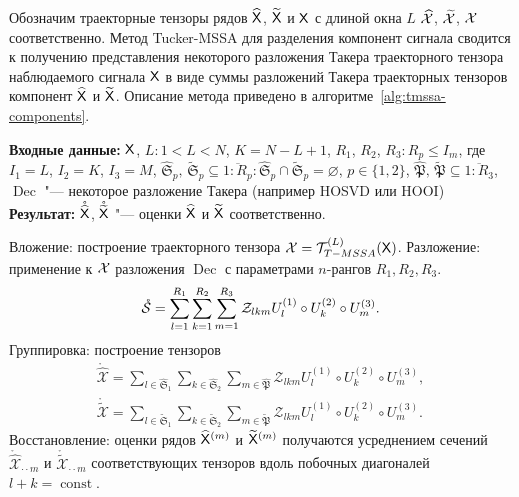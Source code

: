 \documentclass[specialist,
  substylefile = spbu.rtx,
subf,href,colorlinks=true, 12pt]{disser}
\theoremstyle{plain}
\theoremstyle{definition}
\theoremstyle{remark}
\newcommand{\Input}{\textbf{Входные данные: }}
\newcommand{\Output}{\textbf{Результат: }}
\def\tmssa/{Tucker-MSSA}
\begin{document}
Обозначим траекторные тензоры рядов $\widehat{\mathsf{X}}$,
$\widetilde{\mathsf{X}}$ и $\mathsf{X}$ с длиной окна $L$
$\widehat{\mathcal{X}}$, $\widetilde{\mathcal{X}}$, $\mathcal{X}$ соответственно.
Метод \tmssa/ для разделения компонент сигнала сводится к
получению представления некоторого разложения Такера траекторного тензора
наблюдаемого сигнала $\mathsf{X}$ в виде суммы разложений Такера траекторных тензоров
компонент $\widehat{\mathsf{X}}$ и $\widetilde{\mathsf{X}}$.
Описание метода приведено в алгоритме~\ref{alg:tmssa-components}.
\begin{algorithm}[!ht]
  \caption{\tmssa/ для разделения компонент сигнала.}
  \label{alg:tmssa-components}
  \Input $\mathsf{X}$,
  $L: 1< L < N$, $K = N - L + 1$,
  $R_1$, $R_2$, $R_3: R_p \leqslant I_m$, где $I_1=L$, $I_2=K$, $I_3=M$,
  $\widehat{\mathfrak{S}}_p,\, \widetilde{\mathfrak{S}}_p \subseteq
  \overline{1:R_p}:
  \widehat{\mathfrak{S}}_p \cap \widetilde{\mathfrak{S}}_p = \varnothing$,
  $p \in \{1, 2\}$,
  $\widehat{\mathfrak{P}},\, \widetilde{\mathfrak{P}}  \subseteq
  \overline{1:R_3}$, $\operatorname{Dec}$ "--- некоторое разложение
  Такера (например HOSVD или HOOI)\\
  \Output $\mathring{\widehat{\mathsf{X}}}$, $\mathring{\widetilde{\mathsf{X}}}$
  "--- оценки $\widehat{\mathsf{X}}$ и $\widetilde{\mathsf{X}}$
  соответственно.
  \begin{algorithmic}[1]
    \State Вложение: построение траекторного тензора $\mathcal{X} =
    \mathcal{T}_{T-MSSA}^{(L)}(\mathsf{X})$. \label{algstep:tmssa-inj}
    \State Разложение: применение к $\mathcal{X}$ разложения
    $\operatorname{Dec}$ с параметрами $n$-рангов $R_1, R_2, R_3$.
    \label{algstep:tmssa-decomp}
    \begin{equation*}
      \mathring{\mathcal{S}} = \sum_{l=1}^{R_1} \sum_{k=1}^{R_2} \sum_{m=1}^{R_3}
      \mathcal{Z}_{lkm} U_l^{(1)}\circ U_k^{(2)} \circ U_m^{(3)}.
      \label{eq:tmssa}
    \end{equation*}
    \State Группировка: построение тензоров
    \begin{gather*}
      \mathring{\widehat{\mathcal{X}}}=\sum_{l \in \widehat{\mathfrak{S}}_1}
      \sum_{k\in \widehat{\mathfrak{S}}_2}
      \sum_{m\in \widehat{\mathfrak{P}}}
      \mathcal{Z}_{lkm} U^{(1)}_{l}\circ U^{(2)}_{k} \circ U^{(3)}_{m},\\
      \mathring{\widetilde{\mathcal{X}}}=\sum_{l \in
      \widetilde{\mathfrak{S}}_1}
      \sum_{k\in \widetilde{\mathfrak{S}}_2}
      \sum_{m\in \widetilde{\mathfrak{P}}}
      \mathcal{Z}_{lkm} U^{(1)}_{l}\circ U^{(2)}_{k} \circ U^{(3)}_{m}.
    \end{gather*}
    \State %
    Восстановление: оценки рядов $\widehat{\mathsf{X}}^{(m)}$ и
    $\widetilde{\mathsf{X}}^{(m)}$ получаются усреднением сечений
    $\mathring{\widehat{\mathcal{X}}}_{\cdot \cdot m}$
    и $\mathring{\widetilde{\mathcal{X}}}_{\cdot\cdot m}$ соответствующих
    тензоров вдоль побочных диагоналей $l+k = \operatorname{const}$.
  \end{algorithmic}
\end{algorithm}
\end{document}
